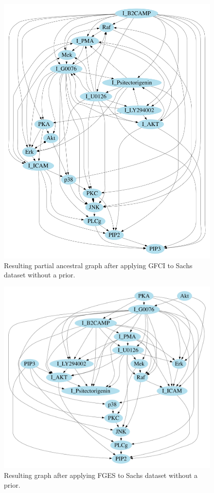 \documentclass[a4paper,pdf]{article}
\begin{document}
\begin{figure}[!ht]
    \centering
    \includegraphics[width=\textwidth]{additional/sachsGraph_bootstrap0_priorFALSEgfci}
    \caption{Resulting partial ancestral graph after applying GFCI to Sachs dataset without a prior. \label{fig:sachspagnopriorgfci}}
\end{figure}
\begin{figure}[!ht]
    \centering
    \includegraphics[width=\textwidth]{additional/sachsGraph_bootstrap0_priorFALSEfges}
    \caption{Resulting graph after applying FGES to Sachs dataset without a prior. \label{fig:sachspagnopriorfges}}
\end{figure}
\end{document}
